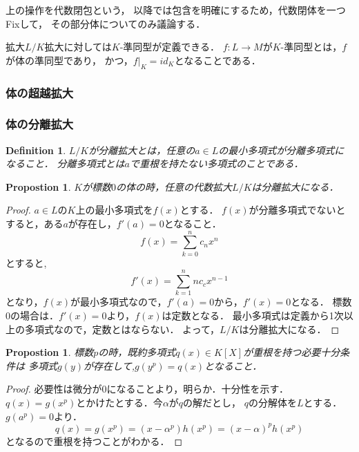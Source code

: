 \documentclass{ujarticle}
\newtheorem{dfn}[thm]{Definition}
\newtheorem{prop}[thm]{Propostion}
\begin{document}
上の操作を代数閉包という，
以降では包含を明確にするため，代数閉体を一つFixして，
その部分体についてのみ議論する．

拡大$L/K$拡大に対しては$K$-準同型が定義できる．
$f:L \to M$が$K$-準同型とは，$f$が体の準同型であり，
かつ，$f|_{K}=id_K$となることである．

\subsubsection{体の超越拡大}
\label{sub:体の超越拡大}

\subsubsection{体の分離拡大}
\label{sub:体の分離拡大}

\begin{dfn}
 $L/K$が分離拡大とは，任意の$a \in L$の最小多項式が分離多項式になること．
 分離多項式とは$a$で重根を持たない多項式のことである．
\end{dfn}

\begin{prop}
 $K$が標数$0$の体の時，任意の代数拡大$L/K$は分離拡大になる．
\end{prop}
\begin{proof}
  $a \in L$の$K$上の最小多項式を$f(x)$とする．
  $f(x)$が分離多項式でないとすると，ある$a$が存在し，$f'(a)=0$となること．
  \begin{equation*}
   f(x)=\sum_{k=0}^n c_nx^n
  \end{equation*}
  とすると,
  \begin{equation*}
   f'(x)=\sum_{k=1}^n nc_cx^{n-1}
  \end{equation*}
  となり，$f(x)$が最小多項式なので，$f'(a)=0$から，$f'(x)=0$となる．
  標数$0$の場合は．$f'(x)=0$より，$f(x)$は定数となる．
  最小多項式は定義から1次以上の多項式なので，定数とはならない．
  よって，$L/K$は分離拡大になる．
\end{proof}

\begin{prop}
  標数$p$の時，既約多項式$q(x) \in K[X]$が重根を持つ必要十分条件は
  多項式$g(y)$が存在して,$g(y^p)=q(x)$となること．
\end{prop}
\begin{proof}
  必要性は微分が$0$になることより，明らか．十分性を示す．
  $q(x)=g(x^p)$とかけたとする．今$ \alpha$が$q$の解だとし，
  $q$の分解体を$L$とする．$g(a^p)=0$より．
  \begin{equation*}
   q(x)=g(x^p)=(x-\alpha^p)h(x^p)=(x-\alpha)^ph(x^p)
  \end{equation*}
  となるので重根を持つことがわかる．
\end{proof}
\end{document}
